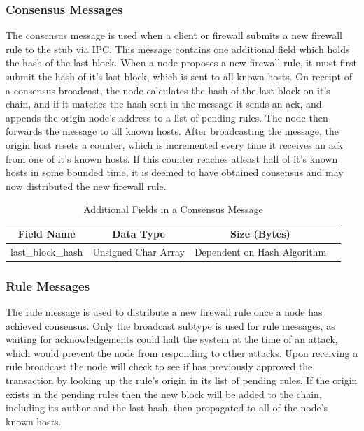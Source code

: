 \documentclass[a4paper, 11pt]{report}
\begin{document}
\subsubsection{Consensus Messages}
The consensus message is used when a client or firewall submits a new firewall rule to the \gls{stub} via \acrshort{IPC}. This message contains one additional field which holds the hash of the last block. When a node proposes a new firewall rule, it must first submit the hash of it's last block, which is sent to all known hosts. On receipt of a consensus broadcast, the node calculates the hash of the last block on it's chain, and if it matches the hash sent in the message it sends an ack, and appends the origin node's address to a list of pending rules. The node then forwards the message to all known hosts. After broadcasting the message, the origin host resets a counter, which is incremented every time it receives an ack from one of it's known hosts. If this counter reaches atleast half of it's known hosts in some bounded time, it is deemed to have obtained consensus and may now distributed the new firewall rule.

\begin{table}[H]
\centering
\begin{tabular}{ |c|c|c|c| } 
\hline
Field Name & Data Type & Size (Bytes) \\
\hline
last_block_hash & Unsigned Char Array & Dependent on Hash Algorithm \\ 
\hline
\end{tabular}
\caption{Additional Fields in a Consensus Message}
\label{tab:consensus}
\end{table}

\subsubsection{Rule Messages}
The rule message is used to distribute a new firewall rule once a node has achieved consensus. Only the broadcast subtype is used for rule messages, as waiting for acknowledgements could halt the system at the time of an attack, which would prevent the node from responding to other attacks. Upon receiving a rule broadcast the node will check to see if has previously approved the transaction by looking up the rule's origin in its list of pending rules. If the origin exists in the pending rules then the new block will be added to the chain, including its author and the last hash, then propagated to all of the node's known hosts.
\end{document}

